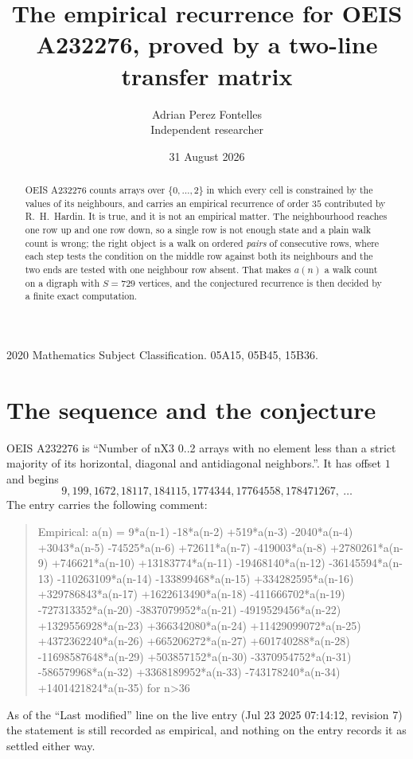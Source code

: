 \documentclass[11pt,a4paper]{article}
\title{The empirical recurrence for OEIS A232276, proved by a two-line transfer matrix}
\author{Adrian Perez Fontelles\\ \small Independent researcher}
\date{31 August 2026}
\theoremstyle{plain}
\theoremstyle{definition}
\begin{document}
\maketitle

\begin{abstract}
OEIS A232276 counts arrays over $\{0,\dots,2\}$ in which every cell is constrained by the
values of its neighbours, and carries an empirical recurrence of order $35$ contributed
by R.~H.~Hardin. It is true, and it is not an empirical matter. The neighbourhood reaches one
row up and one row down, so a single row is not enough state and a plain walk count
is wrong; the right object is a walk on ordered \emph{pairs} of consecutive rows, where
each step tests the condition on the middle row against both its neighbours and the two
ends are tested with one neighbour row absent. That makes $a(n)$ a walk count on a digraph
with $S=729$ vertices, and the conjectured recurrence is then decided by a finite exact
computation.
\end{abstract}

\noindent\small 2020 Mathematics Subject Classification. 05A15, 05B45, 15B36.\normalsize

\section{The sequence and the conjecture}

OEIS A232276 is ``Number of nX3 0..2 arrays with no element less than a strict majority of its horizontal, diagonal and antidiagonal neighbors.''. It has offset $1$ and begins
\[
9, 199, 1672, 18117, 184115, 1774344, 17764558, 178471267,\ \dots
\]
The entry carries the following comment:
\begin{quote}\small
Empirical: a(n) = 9*a(n-1) -18*a(n-2) +519*a(n-3) -2040*a(n-4) +3043*a(n-5) -74525*a(n-6) +72611*a(n-7) -419003*a(n-8) +2780261*a(n-9) +746621*a(n-10) +13183774*a(n-11) -19468140*a(n-12) -36145594*a(n-13) -110263109*a(n-14) -133899468*a(n-15) +334282595*a(n-16) +329786843*a(n-17) +1622613490*a(n-18) -411666702*a(n-19) -727313352*a(n-20) -3837079952*a(n-21) -4919529456*a(n-22) +1329556928*a(n-23) +366342080*a(n-24) +11429099072*a(n-25) +4372362240*a(n-26) +665206272*a(n-27) +601740288*a(n-28) -11698587648*a(n-29) +503857152*a(n-30) -3370954752*a(n-31) -586579968*a(n-32) +3368189952*a(n-33) -743178240*a(n-34) +1401421824*a(n-35) for n>36
\end{quote}
As of the ``Last modified'' line on the live entry (Jul 23 2025 07:14:12, revision 7) the statement is
still recorded as empirical, and nothing on the entry records it as settled either way.
\end{document}
